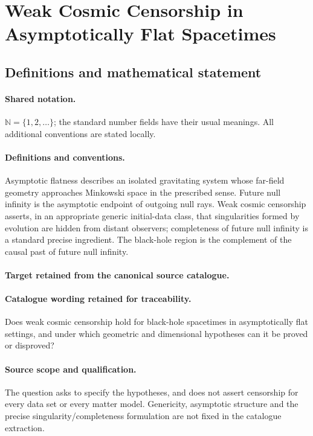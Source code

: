 \documentclass[11pt]{article}
\begin{document}
\section{Weak Cosmic Censorship in Asymptotically Flat Spacetimes}\label{statement}

\subsection{Definitions and mathematical statement}

\paragraph{Shared notation.}$\mathbb N=\{1,2,\ldots\}$; the standard number fields have their usual meanings. All additional conventions are stated locally.


\paragraph{Definitions and conventions.}
Asymptotic flatness describes an isolated gravitating system whose far-field geometry approaches Minkowski space in the prescribed sense. Future null infinity is the asymptotic endpoint of outgoing null rays. Weak cosmic censorship asserts, in an appropriate generic initial-data class, that singularities formed by evolution are hidden from distant observers; completeness of future null infinity is a standard precise ingredient. The black-hole region is the complement of the causal past of future null infinity.

\paragraph{Target retained from the canonical source catalogue.}
\paragraph{Catalogue wording retained for traceability.}
Does weak cosmic censorship hold for black-hole spacetimes in asymptotically flat settings, and under which geometric and dimensional hypotheses can it be proved or disproved?

\paragraph{Source scope and qualification.}
The question asks to specify the hypotheses, and does not assert censorship for every data set or every matter model. Genericity, asymptotic structure and the precise singularity/completeness formulation are not fixed in the catalogue extraction.
\end{document}
